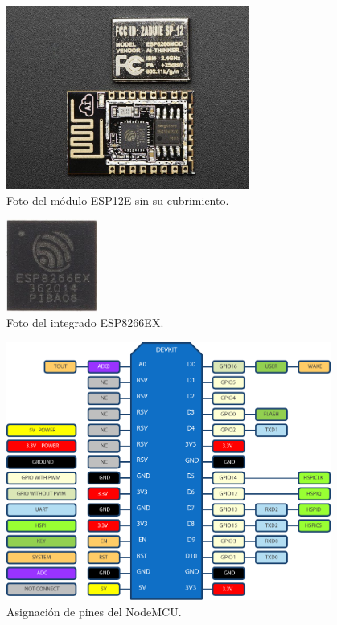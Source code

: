 \begin{figure}[ht!]
	\begin{center}
		\includegraphics[width=8cm]{imagenes/esp12e-foto.jpg}
		\caption{Foto del módulo ESP12E sin su cubrimiento.}
		\label{fig:foto-esp12e}
	\end{center}
\end{figure}

\begin{figure}[ht!]
	\begin{center}
		\includegraphics[width=3cm]{imagenes/esp8266ex.jpg}
		\caption{Foto del integrado ESP8266EX.}
		\label{fig:esp8266ex}
	\end{center}
\end{figure}

\begin{figure}[ht!]
	\begin{center}
		\includegraphics[width=0.95\textwidth]{imagenes/nodemcu-pinout.pdf}
		\caption{Asignación de pines del NodeMCU.}
		\label{fig:nodemcu-pinout}
	\end{center}
\end{figure}

